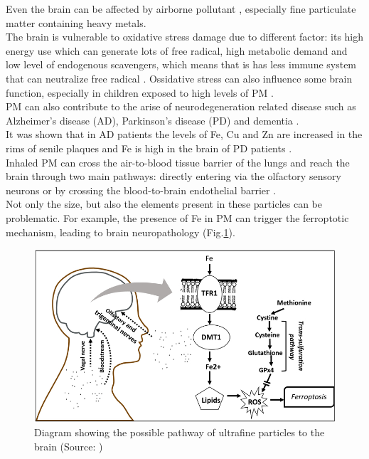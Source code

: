 Even the brain can be affected by airborne pollutant \cite{campbell2014human}, especially fine particulate matter containing heavy metals.\\
The brain is vulnerable to oxidative stress damage due to different factor: its high energy use which can generate lots of free radical, high metabolic demand and low level of endogenous scavengers, which means that is has less immune system that can neutralize free radical \cite{mohankumar2008particulate}. Ossidative stress can also influence some brain function, especially in children exposed to high levels of PM \cite{fagundes2015direct}.\\
PM can also contribute to the arise of neurodegeneration related disease such as Alzheimer’s disease (AD), Parkinson’s disease (PD) and dementia \cite{tsai2019fine}. \\
It was shown that in AD patients the levels of Fe, Cu and Zn are increased in the rims of senile plaques and Fe is high in the brain of PD patients \cite{campbell2005particulate}.\\
Inhaled PM can cross the air-to-blood tissue barrier of the lungs and reach the brain through two main pathways: directly entering via the olfactory sensory neurons or by crossing the blood-to-brain endothelial barrier \cite{hopkins2018repeated}.\\
Not only the size, but also the elements present in these particles can be problematic.
For example, the presence of Fe in PM can trigger the ferroptotic mechanism, leading to brain neuropathology \cite{cory2019impact}(Fig.\ref{fig:brain}).

\begin{figure}[H]
\centering
    \includegraphics[scale=0.7]{images/brain.jpg}
    \caption{Diagram showing the possible pathway of ultrafine particles to the brain (Source: \cite{cory2019impact})
}
    \label{fig:brain}
\end{figure}

